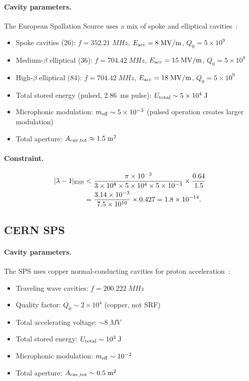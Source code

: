 \documentclass[aps,prd,twocolumn,superscriptaddress,floatfix,nofootinbib]{revtex4-2}
\newcommand{\lam}{\lambda}
\begin{document}
\paragraph{Cavity parameters.}
The European Spallation Source uses a mix of spoke and elliptical
cavities~\cite{Peggs2013}:
\begin{itemize}[nosep]
\item Spoke cavities (26): $f = 352.21\;\si{MHz}$,
$E_{\rm acc} = 8\;\si{MV/m}$, $Q_0 = 5\times10^9$
\item Medium-$\beta$ elliptical (36): $f = 704.42\;\si{MHz}$,
$E_{\rm acc} = 15\;\si{MV/m}$, $Q_0 = 5\times10^9$
\item High-$\beta$ elliptical (84): $f = 704.42\;\si{MHz}$,
$E_{\rm acc} = 18\;\si{MV/m}$, $Q_0 = 5\times10^9$
\item Total stored energy (pulsed, 2.86~ms pulse):
$U_{\rm total} \sim 5\times10^4\;\si{J}$
\item Microphonic modulation: $m_{\rm eff} \sim 5\times10^{-3}$
(pulsed operation creates larger modulation)
\item Total aperture: $A_{\rm cav,tot} \approx 1.5\;\si{m^2}$
\end{itemize}

\paragraph{Constraint.}
\begin{align}
|\lam-1|_{\rm ESS} &< \frac{\pi \times 10^{-3}}
{3\times10^8 \times 5\times10^4 \times 5\times10^{-3}}
\times \frac{0.64}{1.5} \notag\\
&= \frac{3.14\times10^{-3}}{7.5\times10^{10}} \times 0.427
= 1.8\times10^{-14}.
\end{align}

\subsection{CERN SPS}\label{sec:cern}

\paragraph{Cavity parameters.}
The SPS uses copper normal-conducting cavities for proton
acceleration~\cite{Papaphilippou2013}:
\begin{itemize}[nosep]
\item Traveling wave cavities: $f = 200.222\;\si{MHz}$
\item Quality factor: $Q_0 \sim 2\times10^4$ (copper, not SRF)
\item Total accelerating voltage: $\sim 8\;\si{MV}$
\item Total stored energy: $U_{\rm total} \sim 10^3\;\si{J}$
\item Microphonic modulation: $m_{\rm eff} \sim 10^{-2}$
\item Total aperture: $A_{\rm cav,tot} \sim 0.5\;\si{m^2}$
\end{itemize}
\end{document}
